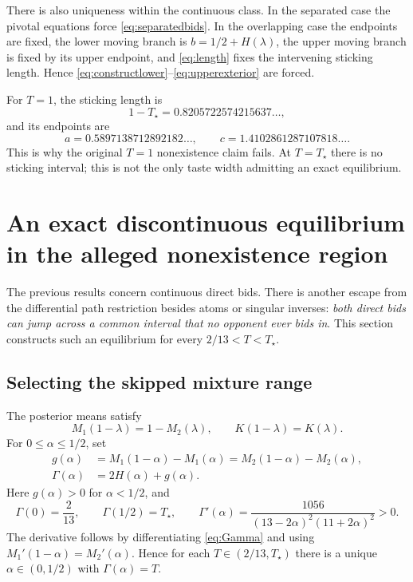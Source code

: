 \documentclass[11pt,a4paper]{article}
\numberwithin{equation}{section}
\theoremstyle{definition}
\theoremstyle{remark}
\newcommand{\Ts}{T_\star}
\begin{document}
There is also uniqueness within the continuous class. In the separated case the pivotal equations force \eqref{eq:separatedbids}. In the overlapping case the endpoints are fixed, the lower moving branch is $b=1/2+H(\lambda)$, the upper moving branch is fixed by its upper endpoint, and \eqref{eq:length} fixes the intervening sticking length. Hence \eqref{eq:constructlower}--\eqref{eq:upperexterior} are forced.

For $T=1$, the sticking length is
\[
 1-\Ts=0.8205722574215637\ldots,
\]
and its endpoints are
\[
 a=0.5897138712892182\ldots,
 \qquad c=1.4102861287107818\ldots.
\]
This is why the original $T=1$ nonexistence claim fails. At $T=\Ts$ there is no sticking interval; this is not the only taste width admitting an exact equilibrium.

\section{An exact discontinuous equilibrium in the alleged nonexistence region}
\label{sec:jumps}

The previous results concern continuous direct bids. There is another escape from the differential path restriction besides atoms or singular inverses: \emph{both direct bids can jump across a common interval that no opponent ever bids in}. This section constructs such an equilibrium for every $2/13<T<\Ts$.

\subsection{Selecting the skipped mixture range}
The posterior means satisfy
\begin{equation}
\label{eq:reflection}
 M_1(1-\lambda)=1-M_2(\lambda),\qquad
 K(1-\lambda)=K(\lambda).
\end{equation}
For $0\le\alpha\le1/2$, set
\begin{align}
 g(\alpha)&=M_1(1-\alpha)-M_1(\alpha)
 =M_2(1-\alpha)-M_2(\alpha),\label{eq:g}\\
 \Gamma(\alpha)&=2H(\alpha)+g(\alpha).\label{eq:Gamma}
\end{align}
Here $g(\alpha)>0$ for $\alpha<1/2$, and
\begin{equation}
\label{eq:Gammabounds}
 \Gamma(0)=\frac2{13},\qquad \Gamma(1/2)=\Ts,
 \qquad
 \Gamma'(\alpha)=
 \frac{1056}{(13-2\alpha)^2(11+2\alpha)^2}>0.
\end{equation}
The derivative follows by differentiating \eqref{eq:Gamma} and using
$M_1'(1-\alpha)=M_2'(\alpha)$. Hence for each $T\in(2/13,\Ts)$ there is a unique $\alpha\in(0,1/2)$ with $\Gamma(\alpha)=T$.
\end{document}
